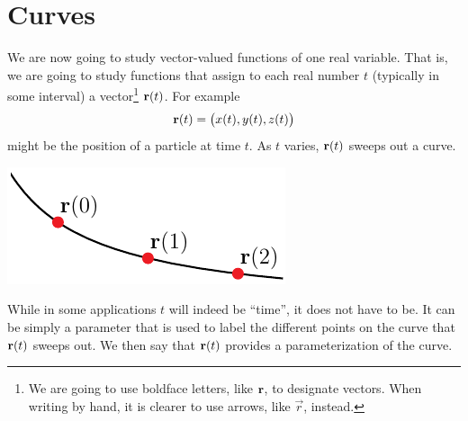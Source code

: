 
\graphicspath{{figures/curves/}}
\chapter{Curves}\label{chap curves}

We are now going to study vector-valued functions of one real variable.
That is, we are going to study functions that assign to each real 
number $t$ (typically in some interval) a vector\footnote{We are going to use 
boldface letters, like $\mathbf{r}$, to designate vectors. When writing by hand,
it is clearer to use arrows, like $\vec r$, instead.} 
$\mathbf{r}(t)$. For example
\begin{equation*}
\mathbf{r}(t) = \big( x(t), y(t), z(t)\big)
\end{equation*}
might be the position of a particle at time $t$. As $t$ varies,
$\mathbf{r}(t)$ sweeps out a curve.
\begin{efig}
\begin{center}
     \includegraphics{parCurve.pdf}
\end{center}
\end{efig}
While in some applications $t$ will indeed be ``time'', it does not
have to be. It can be simply a parameter that is used to label the
different points on the curve that $\mathbf{r}(t)$ sweeps out. We then say 
that $\mathbf{r}(t)$ provides a parameterization of the curve.

